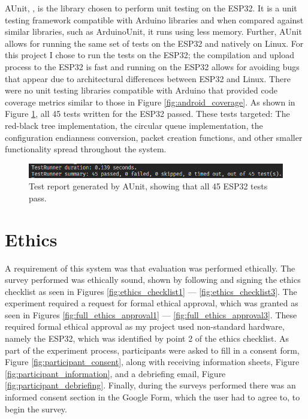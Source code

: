 \documentclass{l4proj}
\begin{document}
AUnit, \citep{park_bxparksaunit_2021}, is the library chosen to perform unit testing on the ESP32. It is a unit testing framework compatible with Arduino libraries and when compared against similar libraries, such as ArduinoUnit, it runs using less memory. Further, AUnit allows for running the same set of tests on the ESP32 and natively on Linux. For this project I chose to run the tests on the ESP32; the compilation and upload process to the ESP32 is fast and running on the ESP32 allows for avoiding bugs that appear due to architectural differences between ESP32 and Linux. There were no unit testing libraries compatible with Arduino that provided code coverage metrics similar to those in Figure \ref{fig:android_coverage}. As shown in Figure \ref{fig:esp32_tests_pass}, all 45 tests written for the ESP32 passed. These tests targeted: The red-black tree implementation, the circular queue implementation, the configuration endianness conversion, packet creation functions, and other smaller functionality spread throughout the system.

\begin{figure}[!htb]
    \centering
    \includegraphics[width=1.0\linewidth]{images/esp32-test-pass.png}

    \caption{ Test report generated by AUnit, showing that all 45 ESP32 tests pass. }

    \label{fig:esp32_tests_pass}
\end{figure}

\section{Ethics}

A requirement of this system was that evaluation was performed ethically. The survey performed was ethically sound, shown by following and signing the ethics checklist as seen in Figures \ref{fig:ethics_checklist1} — \ref{fig:ethics_checklist3}. The experiment required a request for formal ethical approval, which was granted as seen in Figures \ref{fig:full_ethics_approval1} — \ref{fig:full_ethics_approval3}. These required formal ethical approval as my project used non-standard hardware, namely the ESP32, which was identified by point 2 of the ethics checklist. As part of the experiment process, participants were asked to fill in a consent form, Figure \ref{fig:participant_consent}, along with receiving information sheets, Figure \ref{fig:participant_information},  and a debriefing email, Figure \ref{fig:participant_debriefing}. Finally, during the surveys performed there was an informed consent section in the Google Form, which the user had to agree to, to begin the survey.
\end{document}
